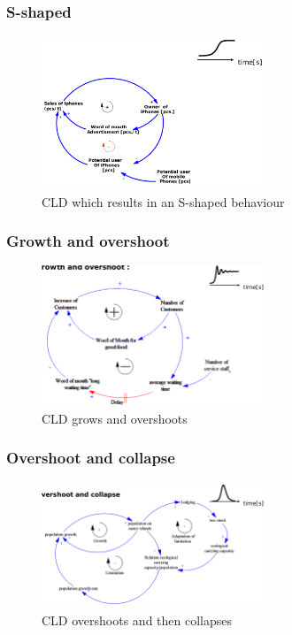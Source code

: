 \subsubsection{S-shaped}
\begin{figure}[H]
	\centering
	\includegraphics[width=0.6\textwidth]{figures/SShapedCLD.png}
	\caption{CLD which results in an S-shaped behaviour}
\end{figure}

\subsubsection{Growth and overshoot}
\begin{figure}[H]
	\centering
	\includegraphics[width=0.6\textwidth]{figures/GrowthOvershootCLD.png}
	\caption{CLD grows and overshoots}
\end{figure}

\subsubsection{Overshoot and collapse}
\begin{figure}[H]
	\centering
	\includegraphics[width=0.6\textwidth]{figures/OvershootCollapseCLD.png}
	\caption{CLD overshoots and then collapses}
\end{figure}

